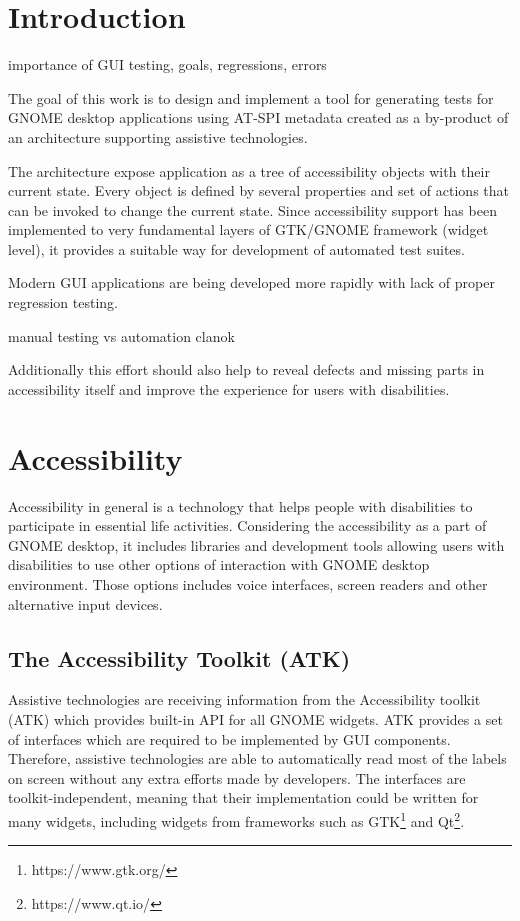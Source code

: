 
\chapter{Introduction}
importance of GUI testing, goals, regressions, errors 

The goal of this work is to design and implement a tool for generating tests for GNOME desktop applications using AT-SPI metadata created as a by-product of an architecture supporting assistive technologies.

The architecture expose application as a tree of accessibility objects with their current state. Every object is defined by several properties and set of actions that can be invoked to change the current state. Since accessibility support has been implemented to very fundamental layers of GTK/GNOME framework (widget level), it provides a suitable way for development of automated test suites.\cite{pyatspi2} 

Modern GUI applications are being developed more rapidly with lack of proper regression testing. 

manual testing vs automation clanok

Additionally this effort should also help to reveal defects and missing parts in accessibility itself and improve the experience for users with disabilities.

\chapter{Accessibility}
Accessibility in general is a technology that helps people with disabilities to participate in essential life activities. Considering the accessibility as a part of GNOME desktop, it includes libraries and development tools allowing users with disabilities to use other options of interaction with GNOME desktop environment. Those options includes voice interfaces, screen readers and other alternative input devices.\cite{gnomeADG}
\section{The Accessibility Toolkit (ATK)}
Assistive technologies are receiving information from the Accessibility toolkit (ATK) which provides built-in API for all GNOME widgets. ATK provides a set of interfaces which are required to be implemented by GUI components. Therefore, assistive technologies are able to automatically read most of the labels on screen without any extra efforts made by developers. The interfaces are toolkit-independent, meaning that their implementation could be written for many widgets, including widgets from frameworks such as GTK\footnote{https://www.gtk.org/} and Qt\footnote{https://www.qt.io/}.

